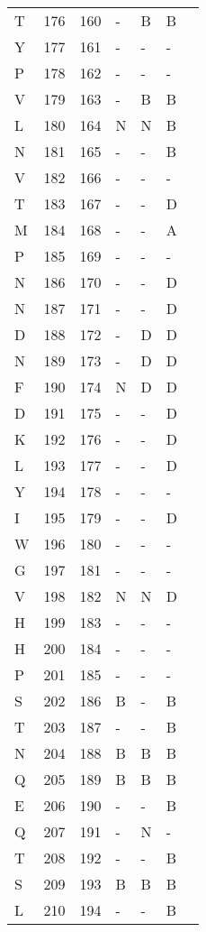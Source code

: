 \documentclass[10pt]{article}
\begin{document}
\begin{longtable}{lllllll}
  T & 176 & 160 & - & B & B &  \\ 
  Y & 177 & 161 & - & - & - &  \\ 
  P & 178 & 162 & - & - & - &  \\ 
  V & 179 & 163 & - & B & B &  \\ 
  L & 180 & 164 & N & N & B &  \\ 
  N & 181 & 165 & - & - & B &  \\ 
  V & 182 & 166 & - & - & - &  \\ 
  T & 183 & 167 & - & - & D &  \\ 
  M & 184 & 168 & - & - & A &  \\ 
  P & 185 & 169 & - & - & - &  \\ 
  N & 186 & 170 & - & - & D &  \\ 
  N & 187 & 171 & - & - & D &  \\ 
  D & 188 & 172 & - & D & D &  \\ 
  N & 189 & 173 & - & D & D &  \\ 
  F & 190 & 174 & N & D & D &  \\ 
  D & 191 & 175 & - & - & D &  \\ 
  K & 192 & 176 & - & - & D &  \\ 
  L & 193 & 177 & - & - & D &  \\ 
  Y & 194 & 178 & - & - & - &  \\ 
  I & 195 & 179 & - & - & D &  \\ 
  W & 196 & 180 & - & - & - &  \\ 
  G & 197 & 181 & - & - & - &  \\ 
  V & 198 & 182 & N & N & D &  \\ 
  H & 199 & 183 & - & - & - &  \\ 
  H & 200 & 184 & - & - & - &  \\ 
  P & 201 & 185 & - & - & - &  \\ 
  S & 202 & 186 & B & - & B &  \\ 
  T & 203 & 187 & - & - & B &  \\ 
  N & 204 & 188 & B & B & B &  \\ 
  Q & 205 & 189 & B & B & B &  \\ 
  E & 206 & 190 & - & - & B &  \\ 
  Q & 207 & 191 & - & N & - &  \\ 
  T & 208 & 192 & - & - & B &  \\ 
  S & 209 & 193 & B & B & B &  \\ 
  L & 210 & 194 & - & - & B &  \\ 

\end{longtable}
\end{document}
